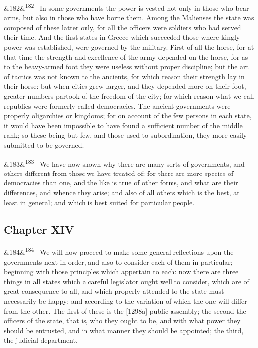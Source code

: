 \documentclass[12pt]{article}
\newcommand{\para}[1][]{\par\noindent\ifx&#1&\else\textsuperscript{\footnotesize #1}~\fi}
\begin{document}
\para[182] In some governments the power is vested not only in those who bear arms, but also in those who have borne them. Among the Malienses the state was composed of these latter only, for all the officers were soldiers who had served their time. And the first states in Greece which succeeded those where kingly power was established, were governed by the military. First of all the horse, for at that time the strength and excellence of the army depended on the horse, for as to the heavy-armed foot they were useless without proper discipline; but the art of tactics was not known to the ancients, for which reason their strength lay in their horse: but when cities grew larger, and they depended more on their foot, greater numbers partook of the freedom of the city; for which reason what we call republics were formerly called democracies. The ancient governments were properly oligarchies or kingdoms; for on account of the few persons in each state, it would have been impossible to have found a sufficient number of the middle rank; so these being but few, and those used to subordination, they more easily submitted to be governed.

\para[183] We have now shown why there are many sorts of governments, and others different from those we have treated of: for there are more species of democracies than one, and the like is true of other forms, and what are their differences, and whence they arise; and also of all others which is the best, at least in general; and which is best suited for particular people.

\subsection*{Chapter XIV}

\para[184] We will now proceed to make some general reflections upon the governments next in order, and also to consider each of them in particular; beginning with those principles which appertain to each: now there are three things in all states which a careful legislator ought well to consider, which are of great consequence to all, and which properly attended to the state must necessarily be happy; and according to the variation of which the one will differ from the other. The first of these is the [1298a] public assembly; the second the officers of the state, that is, who they ought to be, and with what power they should be entrusted, and in what manner they should be appointed; the third, the judicial department.
\end{document}
